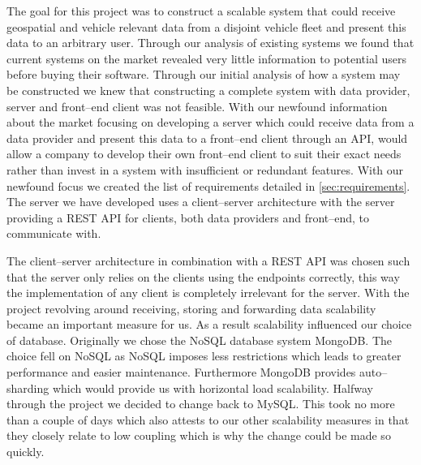 The goal for this project was to construct a scalable system that could receive geospatial and vehicle relevant data from a disjoint vehicle fleet and present this data to an arbitrary user.
Through our analysis of existing systems we found that current systems on the market revealed very little information to potential users before buying their software.
Through our initial analysis of how a system may be constructed we knew that constructing a complete system with data provider, server and front--end client was not feasible.
With our newfound information about the market focusing on developing a server which could receive data from a data provider and present this data to a front--end client through an API, would allow a company to develop their own front--end client to suit their exact needs rather than invest in a system with insufficient or redundant features.
With our newfound focus we created the list of requirements detailed in \cref{sec:requirements}.
The server we have developed uses a client--server architecture with the server providing a REST API for clients, both data providers and front--end, to communicate with.

\bigskip
The client--server architecture in combination with a REST API was chosen such that the server only relies on the clients using the endpoints correctly, this way the implementation of any client is completely irrelevant for the server.
With the project revolving around receiving, storing and forwarding data scalability became an important measure for us.
As a result scalability influenced our choice of database.
Originally we chose the NoSQL database system MongoDB.
The choice fell on NoSQL as NoSQL imposes less restrictions which leads to greater performance and easier maintenance.
Furthermore MongoDB provides auto--sharding which would provide us with horizontal load scalability.
Halfway through the project we decided to change back to MySQL. 
This took no more than a couple of days which also attests to our other scalability measures in that they closely relate to low coupling which is why the change could be made so quickly.

